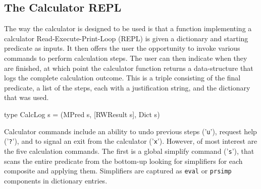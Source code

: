 \subsection{The Calculator REPL}

The way the calculator is designed to be used is
that a function implementing a calculator Read-Execute-Print-Loop (REPL)
is given a dictionary and starting predicate as inputs.
It then offers the user the opportunity to invoke various
commands to perform calculation steps.
The user can then indicate when they are finished,
at which point the calculator function returns
a data-structure that logs the complete calculation outcome.
This is a triple consisting of the final predicate,
a list of the steps, each with a justification string,
and the dictionary that was used.
\begin{code}
type CalcLog s = (MPred s, [RWResult s], Dict s)
\end{code}

Calculator commands include an ability to undo previous steps ('\texttt{u}'),
request help ('\texttt{?}'),
and to signal an exit from the calculator ('\texttt{x}').
However,
of most interest are the five calculation commands.
The first is a global simplify command ('\texttt{s}'),
that scans the entire predicate from the bottom-up
looking for simplifiers for each composite and applying them.
Simplifiers are captured as \texttt{eval} or \texttt{prsimp} components
in dictionary entries.

